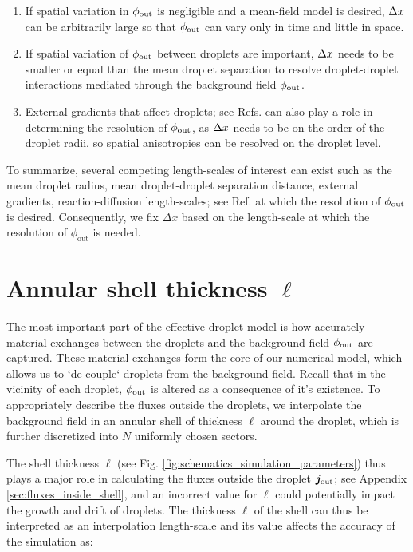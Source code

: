 \begin{enumerate}
    \item If spatial variation in $\phi_\mathrm{out}$ is negligible and a mean-field model is desired, $\Delta x$ can be arbitrarily large so that $\phi_\mathrm{out}$ can vary only in time and little in space.
    
    \item If spatial variation of $\phi_\mathrm{out}$ between droplets are important, $\Delta x$ needs to be smaller or equal than the mean droplet separation to resolve droplet-droplet interactions mediated through the background field $\phi_\mathrm{out}$.
    
    \item External gradients that affect droplets; see Refs. \cite{Review2019,Weber2017,Lee2013,Bressloff2020,Bressloff_2020} can also play a role in determining the resolution of $\phi_\mathrm{out}$, as $\Delta x$ needs to be on the order of the droplet radii, so spatial anisotropies can be resolved on the droplet level.
\end{enumerate}
To summarize, several competing length-scales of interest can exist such as the mean droplet radius, mean droplet-droplet separation distance, external gradients, reaction-diffusion length-scales; see Ref. \cite{Review2019} at which the resolution of $\phi_\mathrm{out}$ is desired. 
Consequently, we fix $\Delta x$ based on the length-scale at which the resolution of $\phi_{\mathrm{out}}$ is needed.

\section{Annular shell thickness $\ell$}

The most important part of the effective droplet model is how accurately material exchanges between the droplets and the background field $\phi_\mathrm{out}$ are captured.
These material exchanges form the core of our numerical model, which allows us to `de-couple` droplets from the background field.
Recall that in the vicinity of each droplet, $\phi_\mathrm{out}$ is altered as a consequence of it's existence.
To appropriately describe the fluxes outside the droplets, we interpolate the background field in an annular shell of thickness $\ell$ around the droplet, which is further discretized into $N$ uniformly chosen sectors.

The shell thickness $\ell$ (see Fig. \ref{fig:schematics_simulation_parameters}) thus plays a major role in calculating the fluxes outside the droplet $\boldsymbol{j}_\mathrm{out}$; see Appendix \ref{sec:fluxes_inside_shell}, and an incorrect value for $\ell$ could potentially impact the growth and drift of droplets.
The thickness $\ell$ of the shell can thus be interpreted as an interpolation length-scale and its value affects the accuracy of the simulation as:

